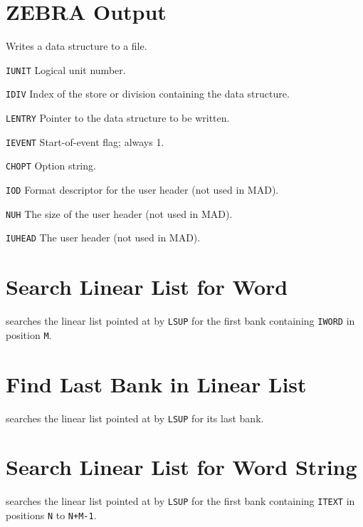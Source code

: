 \section{ZEBRA Output}
\label{FZOUT}
Writes a data structure to a file.
\begin{mylist}
\item[\tt IUNIT]
    Logical unit number.
\item[\tt IDIV]
    Index of the store or division containing the data structure.
\item[\tt LENTRY]
    Pointer to the data structure to be written.
\item[\tt IEVENT]
    Start-of-event flag; always 1.
\item[\tt CHOPT]
    Option string.
\item[\tt IOD]
    Format descriptor for the user header (not used in MAD).
\item[\tt NUH]
    The size of the user header (not used in MAD).
\item[\tt IUHEAD]
    The user header (not used in MAD).
\end{mylist}

\section{Search Linear List for Word}
\label{LZFIND}
searches the linear list pointed at by {\tt LSUP} for the first bank
containing {\tt IWORD} in position {\tt M}.

\section{Find Last Bank in Linear List}
\label{LZLAST}
searches the linear list pointed at by {\tt LSUP} for its last bank.

\section{Search Linear List for Word String}
\label{LZLONG}
searches the linear list pointed at by {\tt LSUP} for the first bank
containing {\tt ITEXT} in positions {\tt N} to {\tt N+M-1}.

